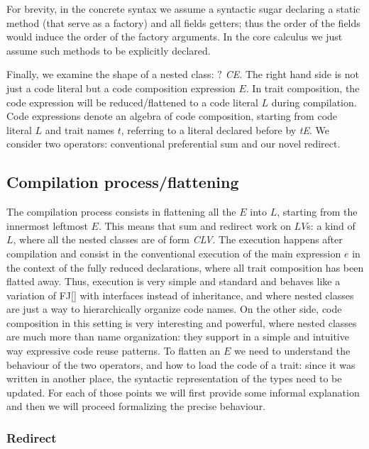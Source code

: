 For brevity, in the concrete syntax we assume a syntactic sugar declaring
a static \Q@of@ method (that serve as a factory) and all fields getters; 
thus the order of the fields would induce the order of the factory arguments.
In the core calculus we just assume such methods to be explicitly declared.

Finally, we examine the shape of a nested class: \textit{$?$ C\eq{}E}.
The right hand side is not just a code literal but a code composition expression $E$.
In trait composition, the code expression will be reduced/flattened to a code literal $L$
during compilation.
Code expressions denote an algebra of code composition, starting from code literal $L$
and trait names $t$, referring to a literal declared before by \textit{t\eq{}E}.
We consider two operators: conventional preferential sum 
 \textit{} and our novel redirect\textit{}.

\subsection{Compilation process/flattening}
The compilation process consists in flattening all the $E$ into $L$,
starting from the innermost leftmost $E$. This means that sum and redirect work on $LV$s:
a kind of $L$, where all the nested classes are of form \textit{C\eq{}LV}.
The execution happens after compilation and consist in the conventional execution of the main expression $e$
in the context of the fully reduced declarations, where all trait composition has
been flatted away.
Thus, execution is very simple and standard and behaves like a variation of FJ[] with interfaces
instead of inheritance, and where nested classes are just a way to hierarchically organize code names.
On the other side, code composition in this setting is very interesting and powerful, where
nested classes are much more than name organization: they support in a simple and intuitive way
expressive code reuse patterns.
To flatten an $E$ we need to understand the behaviour of the two operators, and how to 
load the code of a trait: since it was written in another place, the syntactic representation of
the types need to be updated.
For each of those points we will first provide some informal explanation and then we will proceed formalizing
the precise behaviour.

\subsubsection{Redirect}

